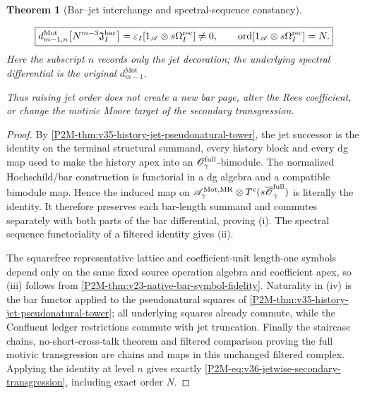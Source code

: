 \documentclass[11pt]{article}
\newtheorem{theorem}{Theorem}[section]
\theoremstyle{remark}
\newcommand{\Mot}{\mathrm{Mot}}
\newcommand{\MR}{\mathrm{MR}}
\newcommand{\ord}{\operatorname{ord}}
\begin{document}
\begin{theorem}[Bar--jet interchange and spectral-sequence constancy]
\begin{enumerate}[label=\textup{(\roman*)}]
\begin{equation}
       \boxed{
       d_{m-1,n}^{\Mot}
       \bigl[N^{m-3}\mathfrak J_I^{\rm bar}\bigr]
       =
       \varepsilon_I
       [1_{\mathscr A}\otimes s\Omega_I^{\rm rec}]
       \ne0,
       \qquad
       \ord[1_{\mathscr A}\otimes s\Omega_I^{\rm rec}]=N.}
       \label{P2M-eq:v36-jetwise-secondary-transgression}
      \end{equation}
      Here the subscript $n$ records only the jet decoration; the underlying
      spectral differential is the original $d_{m-1}^{\Mot}$.
\end{enumerate}
Thus raising jet order does not create a new bar page, alter the Rees
coefficient, or change the motivic Moore target of the secondary
transgression.
\end{theorem}

\begin{proof}
By \cref{P2M-thm:v35-history-jet-pseudonatural-tower}, the jet successor is the
identity on the terminal structural summand, every history block and every dg
map used to make the history apex into an
$\mathscr O_\gamma^{\rm full}$-bimodule.  The normalized Hochschild/bar
construction is functorial in a dg algebra and a compatible bimodule map.
Hence the induced map on
$\mathscr A_\gamma^{\Mot,\MR}\otimes
T^c(s\overline{\mathscr O}_\gamma^{\rm full})$ is literally the identity.
It therefore preserves each bar-length summand and commutes separately with
both parts of the bar differential, proving \textup{(i)}.  The spectral
sequence functoriality of a filtered identity gives \textup{(ii)}.

The squarefree representative lattice and coefficient-unit length-one symbols
depend only on the same fixed source operation algebra and coefficient apex,
so \textup{(iii)} follows from
\cref{P2M-thm:v23-native-bar-symbol-fidelity}.  Naturality in \textup{(iv)} is the
bar functor applied to the pseudonatural squares of
\cref{P2M-thm:v35-history-jet-pseudonatural-tower}; all underlying squares already
commute, while the Confluent ledger restrictions commute with jet truncation.
Finally the staircase chains, no-short-cross-talk theorem and filtered
comparison proving the full motivic transgression are chains and maps in this
unchanged filtered complex.  Applying the identity at level $n$ gives exactly
\eqref{P2M-eq:v36-jetwise-secondary-transgression}, including exact order $N$.
\end{proof}
\end{document}
